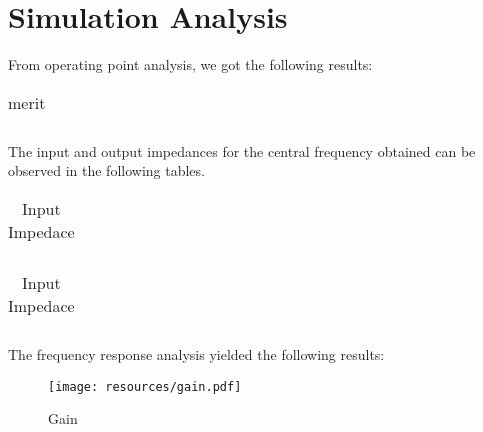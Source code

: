 \section{Simulation Analysis}
\label{sec:simulation} 

From operating point analysis, we got the following results:
\FloatBarrier
\begin{table}[h]
  \centering
  \begin{tabular}{|c|c|c|c|c|}
    \hline    
    
    \hline
  \end{tabular}
  \caption{merit}
  \label{tab:Spice1}
\end{table}
\FloatBarrier  

The input and output impedances for the central frequency obtained can be observed in the following tables.

\FloatBarrier
\begin{table}[h]
  \centering
  \begin{tabular}{|c|c|}
    \hline    
    
    \hline
  \end{tabular}
  \caption{Input Impedace}
  \label{tab:Spice1}
\end{table}
\FloatBarrier 
  
\FloatBarrier
\begin{table}[h]
  \centering
  \begin{tabular}{|c|c|}
    \hline    
    
    \hline
  \end{tabular}
  \caption{Input Impedace}
  \label{tab:Spice1}
\end{table}
\FloatBarrier  

The frequency response analysis yielded the following results:
\begin{figure} [!htb] 
  \texttt{[image: resources/gain.pdf]}
  \caption{Gain}
  \label{fig:theoplots}
  \endminipage\hfill
\end{figure}




